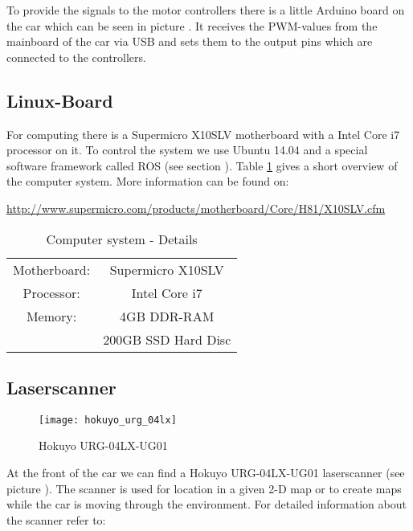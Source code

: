 To provide the signals to the motor controllers there is a little Arduino board on the car which can be seen in picture . It receives the PWM-values from the mainboard of the car via USB and sets them to the output pins which are connected to the controllers.

\subsection{Linux-Board}
\label{sec:overview_board}

For computing there is a Supermicro X10SLV motherboard with a Intel Core i7 processor on it. To control the system we use Ubuntu 14.04 and a special software framework called ROS (see section ). Table \ref{tab:computer_details} gives a short overview of the computer system. More information can be found on:

\hyperref[http://www.supermicro.com/products/motherboard/Core/H81/X10SLV.cfm]{http://www.supermicro.com/products/motherboard/Core/H81/X10SLV.cfm}

\begin{table}[h]
	\centering	
	\begin{tabular}{cc} %
		\hline 
		Motherboard: & Supermicro X10SLV \\
		Processor: & Intel Core i7 \\
		Memory: & 4GB DDR-RAM \\
						& 200GB SSD Hard Disc \\
		\hline
	\end{tabular}
	\caption{Computer system - Details} %
	\label{tab:computer_details}
\end{table}



\newpage
\subsection{Laserscanner}
\label{sec:overview_laserscanner}

\begin{figure}[h]
	\centering
		\texttt{[image: hokuyo\_urg\_04lx]}
	\caption{Hokuyo URG-04LX-UG01}
	\label{fig:hokuyo}
\end{figure}

At the front of the car we can find a Hokuyo URG-04LX-UG01 laserscanner (see picture ). The scanner is used for location in a given 2-D map or to create maps while the car is moving through the environment. For detailed information about the scanner refer to:

